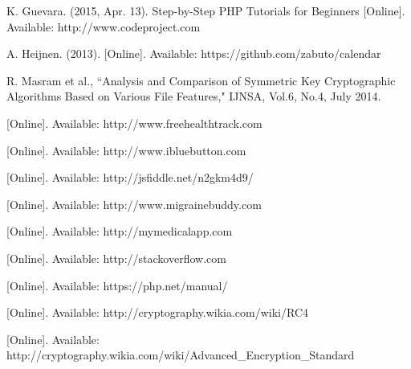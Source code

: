 \documentclass[twocolumn,12pt]{article}
\begin{document}
\clearpage
\onecolumn
\begin{thebibliography}{10}
\raggedright
\small
{}
K. Guevara. (2015, Apr. 13). Step-by-Step PHP Tutorials for Beginners [Online]. Available: http://www.codeproject.com

A. Heijnen. (2013). [Online]. Available: https://github.com/zabuto/calendar

R. Masram et al., ``Analysis and Comparison of Symmetric Key Cryptographic Algorithms Based on Various File Features," IJNSA, Vol.6, No.4, July 2014.

[Online]. Available: http://www.freehealthtrack.com

[Online]. Available: http://www.ibluebutton.com

[Online]. Available: http://jsfiddle.net/n2gkm4d9/

[Online]. Available: http://www.migrainebuddy.com

[Online]. Available: http://mymedicalapp.com

[Online]. Available: http://stackoverflow.com

[Online]. Available: https://php.net/manual/

[Online]. Available: http://cryptography.wikia.com/wiki/RC4

[Online]. Available: http://cryptography.wikia.com/wiki/Advanced\_Encryption\_Standard

\end{thebibliography}
\end{document}

